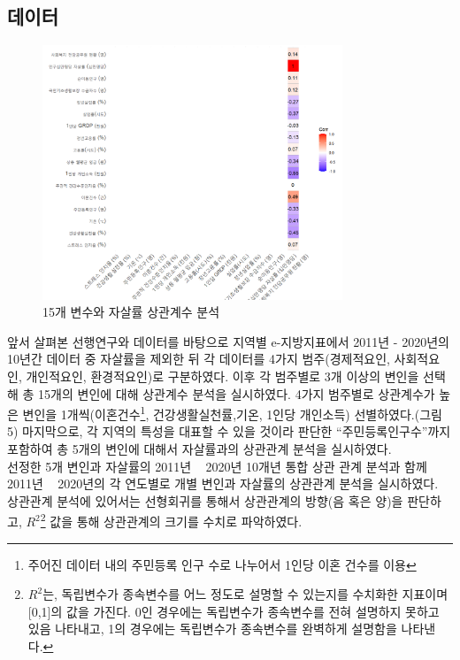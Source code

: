 \documentclass[a4paper, 11pt]{oblivoir}
\begin{document}
    \subsection{데이터}
    \begin{figure}[!ht]
        \includegraphics[width = 0.8\textwidth]{picture5.png}
        \caption{15개 변수와 자살률 상관계수 분석}
        \label{fig:pic5}
      \end{figure}
    앞서 살펴본 선행연구와 데이터를 바탕으로 지역별 e-지방지표에서 2011년 - 2020년의 10년간 데이터 중 자살률을 제외한 뒤 각 데이터를
    4가지 범주(경제적요인, 사회적요인, 개인적요인, 환경적요인)로 구분하였다. 이후 각 범주별로 3개 이상의 변인을 선택해 총 15개의 변인에 대해 상관계수 분석을 실시하였다. 
    4가지 범주별로 상관계수가 높은 변인을 1개씩(이혼건수\footnote{주어진 데이터 내의 주민등록 인구 수로 나누어서 1인당 이혼 건수를 이용}, 건강생활실천률,기온, 1인당 개인소득) 선별하였다.(그림 5) 마지막으로, 각 지역의 특성을
    대표할 수 있을 것이라 판단한 ``주민등록인구수''까지 포함하여 총 5개의 변인에 대해서 자살률과의 상관관계 분석을 실시하였다. 
    \\
    선정한 5개 변인과 자살률의 2011년 ~ 2020년 10개년 통합 상관 관계 분석과 함께 2011년 ~ 2020년의 각 연도별로 개별 변인과 자살률의 상관관계 분석을 실시하였다. 
    상관관계 분석에 있어서는 선형회귀를 통해서 상관관계의 방향(음 혹은 양)을 판단하고, $R^{2}$\footnote{$R^{2}$는, 독립변수가 종속변수를 어느 정도로 설명할 수 있는지를 수치화한 지표이며 [0,1]의 값을 가진다. 0인 경우에는 
    독립변수가 종속변수를 전혀 설명하지 못하고 있음 나타내고, 1의 경우에는 독립변수가 종속변수를 완벽하게 설명함을 나타낸다.} 값을 통해 상관관계의 크기를 수치로 파악하였다.  
    \\
\end{document}
